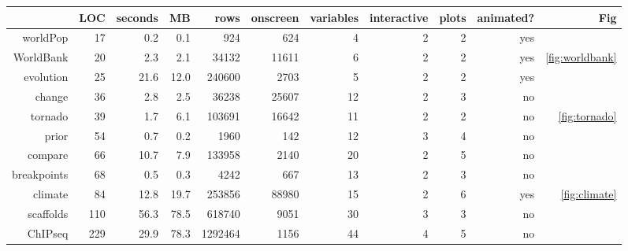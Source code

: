 \begin{tabular}{rrrrrrrrrrr}
  \hline
 & LOC & seconds & MB & rows & onscreen & variables & interactive & plots & animated? & Fig \\ 
  \hline
worldPop & 17 & 0.2 & 0.1 & 924 & 624 &  4 &  2 &  2 & yes &  \\ 
  WorldBank & 20 & 2.3 & 2.1 & 34132 & 11611 &  6 &  2 &  2 & yes &  \ref{fig:worldbank} \\ 
  evolution & 25 & 21.6 & 12.0 & 240600 & 2703 &  5 &  2 &  2 & yes &  \\ 
  change & 36 & 2.8 & 2.5 & 36238 & 25607 & 12 &  2 &  3 & no &  \\ 
  tornado & 39 & 1.7 & 6.1 & 103691 & 16642 & 11 &  2 &  2 & no &  \ref{fig:tornado} \\ 
  prior & 54 & 0.7 & 0.2 & 1960 & 142 & 12 &  3 &  4 & no &  \\ 
  compare & 66 & 10.7 & 7.9 & 133958 & 2140 & 20 &  2 &  5 & no &  \\ 
  breakpoints & 68 & 0.5 & 0.3 & 4242 & 667 & 13 &  2 &  3 & no &  \\ 
  climate & 84 & 12.8 & 19.7 & 253856 & 88980 & 15 &  2 &  6 & yes &  \ref{fig:climate} \\ 
  scaffolds & 110 & 56.3 & 78.5 & 618740 & 9051 & 30 &  3 &  3 & no &  \\ 
  ChIPseq & 229 & 29.9 & 78.3 & 1292464 & 1156 & 44 &  4 &  5 & no & \\ 
   \hline
\end{tabular}
